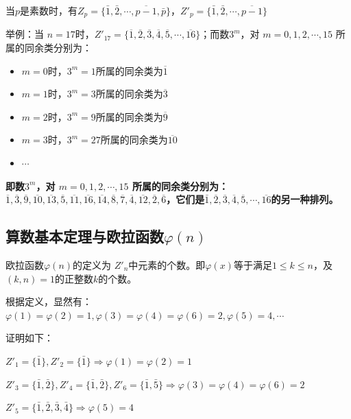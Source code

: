 \documentclass[12pt]{article}
\begin{document}
当$p$是素数时，有$Z_p = \{\bar{1}, \bar{2}, \cdots, \overline{p-1}, \bar{p}\}$，$Z'_p = \{\bar{1}, \bar{2}, \cdots, \overline{p-1} \}$

\begin{framed}
\small {
举例：当 $n=17$时，$Z'_{17} = \{\overline{1}, \overline{2}, \overline{3}, \overline{4}, \overline{5},\cdots, \overline{16}\}$；而数$3^m$，对 $m = 0, 1, 2, \cdots, 15$ 所属的同余类分别为：
\begin{itemize}
\setlength{\itemsep}{0pt}
\setlength{\parsep}{0pt}
\setlength{\parskip}{0pt}
    \item $m=0$时，$3^m = 1$所属的同余类为$\overline{1}$
    \item $m=1$时，$3^m = 3$所属的同余类为$\overline{3}$
    \item $m=2$时，$3^m = 9$所属的同余类为$\overline{9}$
    \item $m=3$时，$3^m = 27$所属的同余类为$\overline{10}$
    \item $\cdots$
\end{itemize}

\textbf{即数$3^m$，对 $m = 0, 1, 2, \cdots, 15$ 所属的同余类分别为：$\overline{1}, \overline{3}, \overline{9}, \overline{10}, \overline{13}, \overline{5}, \overline{11}, \overline{16}, \overline{14}, \overline{8}, \overline{7}, \overline{4}, \overline{12}, \overline{2}, \overline{6}$，它们是$\bar{1}, \overline{2}, \overline{3}, \overline{4}, \overline{5},\cdots, \overline{16}$的另一种排列。}
}
\end{framed}

\subsection{算数基本定理与欧拉函数$\varphi(n)$}
欧拉函数$\varphi(n)$的定义为 $Z'_n$中元素的个数。即$\varphi(x)$等于满足$1\le k \le n$，及$(k,n)=1$的正整数$k$的个数。

根据定义，显然有：$\varphi(1) = \varphi(2) = 1, \varphi(3) = \varphi(4) = \varphi(6) = 2, \varphi(5) = 4, \cdots$

\begin{framed}
\small {
证明如下：

$ Z'_1 = \{\bar{1}\}, Z'_2 = \{\bar{1}\} \Rightarrow \varphi(1) = \varphi(2) = 1 $

$ Z'_3 = \{\bar{1}, \bar{2}\}, Z'_4 = \{\bar{1}, \bar{2}\}, Z'_6 = \{\bar{1}, \bar{5}\} \Rightarrow \varphi(3) = \varphi(4) = \varphi(6) = 2 $

$ Z'_5 = \{\bar{1}, \bar{2}, \bar{3}, \bar{4}\} \Rightarrow \varphi(5) = 4 $
}
\end{framed}
\end{document}
